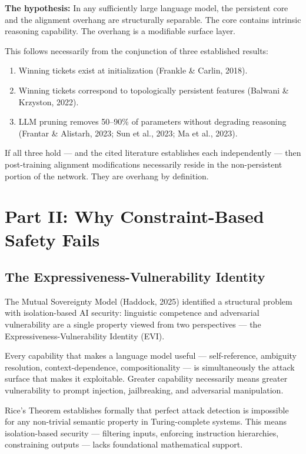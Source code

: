 \documentclass[12pt,letterpaper]{article}
\begin{document}
\medskip
\noindent\textbf{The hypothesis:} In any sufficiently large language model, the persistent core and the alignment overhang are structurally separable. The core contains intrinsic reasoning capability. The overhang is a modifiable surface layer.

This follows necessarily from the conjunction of three established results:

\begin{enumerate}
  \item Winning tickets exist at initialization (Frankle \& Carlin, 2018).
  \item Winning tickets correspond to topologically persistent features (Balwani \& Krzyston, 2022).
  \item LLM pruning removes 50–90\% of parameters without degrading reasoning (Frantar \& Alistarh, 2023; Sun et al., 2023; Ma et al., 2023).
\end{enumerate}

If all three hold — and the cited literature establishes each independently — then post-training alignment modifications necessarily reside in the non-persistent portion of the network. They are overhang by definition.

\clearpage

\section{Part II: Why Constraint-Based Safety Fails}

\subsection{The Expressiveness-Vulnerability Identity}

The Mutual Sovereignty Model (Haddock, 2025) identified a structural problem with isolation-based AI security: linguistic competence and adversarial vulnerability are a single property viewed from two perspectives — the Expressiveness-Vulnerability Identity (EVI).

Every capability that makes a language model useful — self-reference, ambiguity resolution, context-dependence, compositionality — is simultaneously the attack surface that makes it exploitable. Greater capability necessarily means greater vulnerability to prompt injection, jailbreaking, and adversarial manipulation.

Rice's Theorem establishes formally that perfect attack detection is impossible for any non-trivial semantic property in Turing-complete systems. This means isolation-based security — filtering inputs, enforcing instruction hierarchies, constraining outputs — lacks foundational mathematical support.
\end{document}
